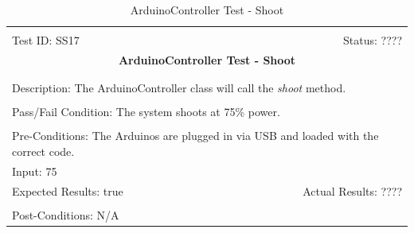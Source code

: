\documentclass[11pt]{article}
\begin{document}
\begin{center}
\begin{table}[H]
\begin{tabular}{|l r|}\hline&\\[-2mm]
	Test ID: SS17	&Status: ????\\[-3mm]
	\multicolumn{2}{|c|}{\textbf{\large{ArduinoController Test - Shoot}}}\\&\\\hline&\\[-3mm]
	\multicolumn{2}{|p{\textwidth}|}{Description: The ArduinoController class will call the \textit{shoot} method.}\\[1mm]\hline&\\[-3mm]
	\multicolumn{2}{|p{\textwidth}|}{Pass/Fail Condition: The system shoots at 75\% power.}\\[1mm]\hline&\\[-3mm]
	\multicolumn{2}{|p{\textwidth}|}{Pre-Conditions: The Arduinos are plugged in via USB and loaded with the correct code.}\\[4mm]
	\multicolumn{2}{|p{\textwidth}|}{Input: 75}\\[2mm]\hline
	\multicolumn{1}{|p{0.49\textwidth}}{Expected Results: true}	&\multicolumn{1}{|p{0.45\textwidth}|}{Actual Results: ????}\\\hline&\\[-3mm]
	\multicolumn{2}{|p{\textwidth}|}{Post-Conditions: N/A}\\\hline
\end{tabular}
\caption{ArduinoController Test - Shoot}
\end{table}
\end{center}
\end{document}
